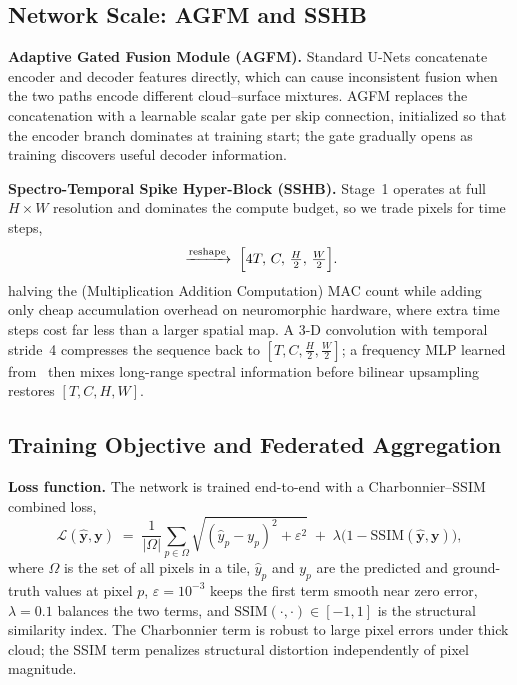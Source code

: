 \documentclass[conference]{IEEEtran}
\newcommand{\AGFM}{\textsc{AGFM}}
\newcommand{\SSHB}{\textsc{SSHB}}
\begin{document}
\subsection{Network Scale: AGFM and SSHB}
\label{sec:framework-network}

\noindent\textbf{Adaptive Gated Fusion Module (\AGFM{}).}
Standard U-Nets concatenate encoder and decoder features directly,
which can cause inconsistent fusion when the two paths encode
different cloud--surface mixtures. \AGFM{} replaces the
concatenation with a learnable scalar gate per skip connection,
initialized so that the encoder branch dominates at training start;
the gate gradually opens as training discovers useful decoder
information.

\noindent\textbf{Spectro-Temporal Spike Hyper-Block (\SSHB{}).}
Stage~1 operates at full $H{\times}W$ resolution and dominates the
compute budget, so we trade pixels for time steps,
\begin{equation}
    [T,\,C,\,H,\,W]
    \;\xrightarrow{\mathrm{reshape}}\;
    \Bigl[4T,\,C,\,\tfrac{H}{2},\,\tfrac{W}{2}\Bigr].
    \label{eq:sshb-reshape}
\end{equation}
halving the (Multiplication Addition Computation) MAC count while adding only cheap accumulation
overhead on neuromorphic hardware, where extra time steps cost far less
than a larger spatial map. A  3-D convolution with
temporal stride~4 compresses the sequence back to
$[T,C,\frac{H}{2},\frac{W}{2}]$; a frequency
MLP learned from~\cite{ref:darkir2024} then mixes long-range spectral information
before bilinear upsampling restores $[T,C,H,W]$.

\subsection{Training Objective and Federated Aggregation}
\label{sec:framework-loss}

\noindent\textbf{Loss function.}
The network is trained end-to-end with a Charbonnier--SSIM combined
loss,
\begin{equation}
    \mathcal{L}(\hat{\mathbf{y}},\mathbf{y})
    \;=\;
    \frac{1}{|\Omega|}\sum_{p\in\Omega}
    \sqrt{(\hat{y}_p - y_p)^2 + \varepsilon^2}
    \;+\;
    \lambda\bigl(1 - \mathrm{SSIM}(\hat{\mathbf{y}},\mathbf{y})\bigr),
    \label{eq:loss}
\end{equation}
where $\Omega$ is the set of all pixels in a tile, $\hat{y}_p$ and
$y_p$ are the predicted and ground-truth values at pixel $p$,
$\varepsilon\!=\!10^{-3}$ keeps the first term smooth near zero error,
$\lambda\!=\!0.1$ balances the two terms, and
$\mathrm{SSIM}(\cdot,\cdot)\in[-1,1]$ is the structural similarity
index. The Charbonnier term is robust to large pixel errors under thick
cloud; the SSIM term penalizes structural distortion independently of
pixel magnitude.
\end{document}
